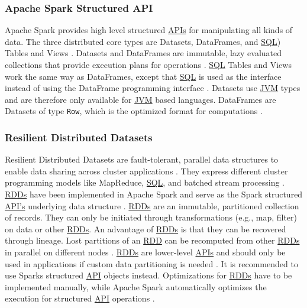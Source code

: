 \subsubsection{Apache Spark Structured API}
Apache Spark provides high level structured \hyperlink{abbr:api}{APIs} for manipulating all kinds of data. The three distributed core types are Datasets, DataFrames, and \hyperlink{abbr:sql}{SQL}) Tables and Views \cite{Chambers2018Spark}.
Datasets and DataFrames are immutable, lazy evaluated collections that provide execution plans for operations \cite{Chambers2018Spark}. \hyperlink{abbr:sql}{SQL} Tables and Views work the same way as DataFrames, except that \hyperlink{abbr:sql}{SQL} is used as the interface instead of using the DataFrame programming interface \cite{Chambers2018Spark}.
Datasets use \hyperlink{abbr:jvm}{JVM} types and are therefore only available for \hyperlink{abbr:jvm}{JVM} based languages. DataFrames are Datasets of type \texttt{Row}, which is the optimized format for computations \cite{Chambers2018Spark}.


\subsubsection{Resilient Distributed Datasets}
Resilient Distributed Datasets are fault-tolerant, parallel data structures to enable data sharing across cluster applications \cite{Zaharia2012RDDs}. They express different cluster programming models like MapReduce, \hyperlink{abbr:sql}{SQL}, and batched stream processing \cite{Zaharia2012RDDs}. \hyperlink{abbr:rdd}{RDDs} have been implemented in Apache Spark and serve as the Spark structured \hyperlink{abbr:api}{API's} underlying data structure \cite{Zaharia2012RDDs}.
\hyperlink{abbr:rdd}{RDDs} are an immutable, partitioned collection of records. They can only be initiated through transformations (e.g., map, filter) on data or other \hyperlink{abbr:rdd}{RDDs}.
An advantage of \hyperlink{abbr:rdd}{RDDs} is that they can be recovered through lineage. Lost partitions of an \hyperlink{abbr:rdd}{RDD} can be recomputed from other \hyperlink{abbr:rdd}{RDDs} in parallel on different nodes \cite{Zaharia2012RDDs}. 
\hyperlink{abbr:rdd}{RDDs} are lower-level \hyperlink{abbr:api}{APIs} and should only be used in applications if custom data partitioning is needed \cite{Chambers2018Spark}. It is recommended to use Sparks structured \hyperlink{abbr:api}{API} objects instead. Optimizations for \hyperlink{abbr:rdd}{RDDs} have to be implemented manually, while Apache Spark automatically optimizes the execution for structured \hyperlink{abbr:api}{API} operations \cite{Chambers2018Spark}.


